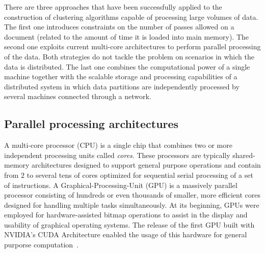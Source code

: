 \documentclass[10pt]{article}
\begin{document}
There are three approaches that have been successfully applied to the construction of clustering algorithms capable of processing large volumes of data. The first one introduces constraints on the number of passes allowed on a document (related to the amount of time it is loaded into main memory). The second one exploits current multi-core architectures to perform parallel processing of the data. Both strategies do not tackle the problem on scenarios in which the data is distributed.
The last one combines the computational power of a single machine together with the scalable storage and processing capabilities of a distributed system in which data partitions are independently processed by several machines connected through a network.

\subsection*{Parallel processing architectures}

A multi-core processor (CPU) is a single chip that combines two or more independent processing units called \textit{cores}.
These processors are typically shared-memory architectures designed to support general purpose operations and contain from $2$ to several tens of cores optimized for sequential serial processing of a set of instructions.
A Graphical-Processing-Unit (GPU) is a massively parallel processor consisting of hundreds or even thousands of smaller, more efficient cores designed for handling multiple tasks simultaneously. At its beginning, GPUs were employed for hardware-assisted bitmap operations to assist in the display and usability of graphical operating systems. The release of the first GPU built with NVIDIA's CUDA Architecture enabled the usage of this hardware for general purporse computation~\citep{SK10}.

\end{document}
